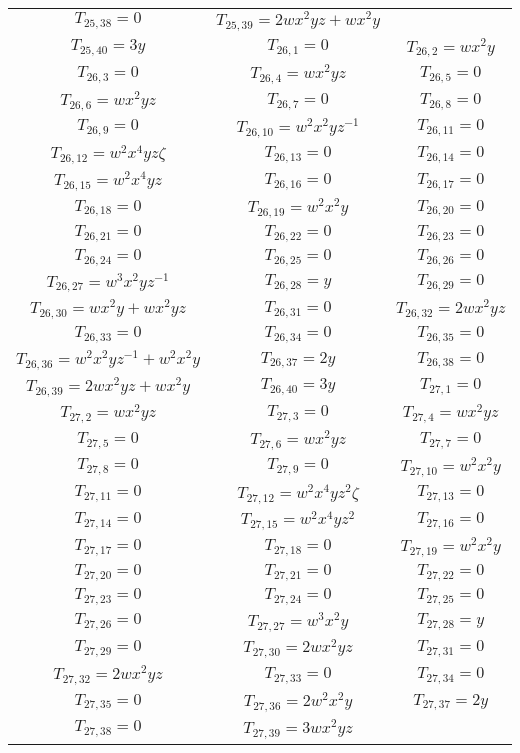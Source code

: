 \documentclass[12pt]{memoireuqam1.3}
\begin{document}
\begin{longtable}{|c|c|c|}
$T_{25,38}= 0$&
$T_{25,39}= 2wx^2yz+wx^2y$\\
$T_{25,40}= 3y$&
$T_{26,1}= 0$&
$T_{26,2}= wx^2y$\\
$T_{26,3}= 0$&
$T_{26,4}= wx^2yz$&
$T_{26,5}= 0$\\
$T_{26,6}= wx^2yz$&
$T_{26,7}= 0$&
$T_{26,8}= 0$\\
$T_{26,9}= 0$&
$T_{26,10}= w^2x^2yz^{-1}$&
$T_{26,11}= 0$\\
$T_{26,12}= w^2x^4yz\zeta$&
$T_{26,13}= 0$&
$T_{26,14}= 0$\\
$T_{26,15}= w^2x^4yz$&
$T_{26,16}= 0$&
$T_{26,17}= 0$\\
$T_{26,18}= 0$&
$T_{26,19}= w^2x^2y$&
$T_{26,20}= 0$\\
$T_{26,21}= 0$&
$T_{26,22}= 0$&
$T_{26,23}= 0$\\
$T_{26,24}= 0$&
$T_{26,25}= 0$&
$T_{26,26}= 0$\\
$T_{26,27}= w^3x^2yz^{-1}$&
$T_{26,28}= y$&
$T_{26,29}= 0$\\
$T_{26,30}= wx^2y+wx^2yz$&
$T_{26,31}= 0$&
$T_{26,32}= 2wx^2yz$\\
$T_{26,33}= 0$&
$T_{26,34}= 0$&
$T_{26,35}= 0$\\
$T_{26,36}= w^2x^2yz^{-1}+w^2x^2y$&
$T_{26,37}= 2y$&
$T_{26,38}= 0$\\
$T_{26,39}= 2wx^2yz+wx^2y$&
$T_{26,40}= 3y$&
$T_{27,1}= 0$\\
$T_{27,2}= wx^2yz$&
$T_{27,3}= 0$&
$T_{27,4}= wx^2yz$\\
$T_{27,5}= 0$&
$T_{27,6}= wx^2yz$&
$T_{27,7}= 0$\\
$T_{27,8}= 0$&
$T_{27,9}= 0$&
$T_{27,10}= w^2x^2y$\\
$T_{27,11}= 0$&
$T_{27,12}= w^2x^4yz^2\zeta$&
$T_{27,13}= 0$\\
$T_{27,14}= 0$&
$T_{27,15}= w^2x^4yz^2$&
$T_{27,16}= 0$\\
$T_{27,17}= 0$&
$T_{27,18}= 0$&
$T_{27,19}= w^2x^2y$\\
$T_{27,20}= 0$&
$T_{27,21}= 0$&
$T_{27,22}= 0$\\
$T_{27,23}= 0$&
$T_{27,24}= 0$&
$T_{27,25}= 0$\\
$T_{27,26}= 0$&
$T_{27,27}= w^3x^2y$&
$T_{27,28}= y$\\
$T_{27,29}= 0$&
$T_{27,30}= 2wx^2yz$&
$T_{27,31}= 0$\\
$T_{27,32}= 2wx^2yz$&
$T_{27,33}= 0$&
$T_{27,34}= 0$\\
$T_{27,35}= 0$&
$T_{27,36}= 2w^2x^2y$&
$T_{27,37}= 2y$\\
$T_{27,38}= 0$&
$T_{27,39}= 3wx^2yz$&

\end{longtable}
\end{document}
